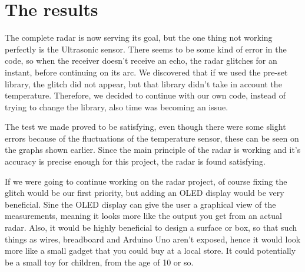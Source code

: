 \chapter{The results}
The complete radar is now serving its goal, but the one thing not working perfectly is the Ultrasonic sensor. There seems to be some kind of error in the code, so when the receiver doesn't receive an echo, the radar glitches for an instant, before continuing on its arc. We discovered that if we used the pre-set library, the glitch did not appear, but that library didn't take in account the temperature. Therefore, we decided to continue with our own code, instead of trying to change the library, also time was becoming an issue.  

The test we made proved to be satisfying, even though there were some slight errors because of the fluctuations of the temperature sensor, these can be seen on the graphs shown earlier. Since the main principle of the radar is working and it's accuracy is precise enough for this project, the radar is found satisfying. 

If we were going to continue working on the radar project, of course fixing the glitch would be our first priority, but adding an OLED display would be very beneficial. Sine the OLED display can give the user a graphical view of the measurements, meaning it looks more like the output you get from an actual radar. Also, it would be highly beneficial to design a surface or box, so that such things as wires, breadboard and Arduino Uno aren't exposed, hence it would look more like a small gadget that you could buy at a local store. It could potentially be a small toy for children, from the age of 10 or so. 